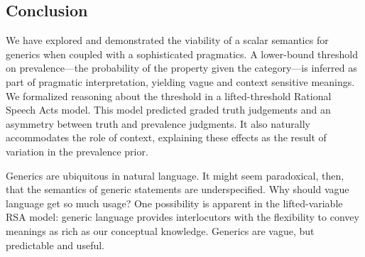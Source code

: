 \documentclass[10pt,letterpaper]{article}
\begin{document}
%
% 
\subsection{Conclusion} 


We have explored and demonstrated the viability of a scalar semantics for generics when coupled with a sophisticated pragmatics. 
A lower-bound threshold on prevalence---the probability of the property given the category---is inferred as part of pragmatic interpretation, yielding vague and context sensitive meanings. 
%
%
We formalized reasoning about the threshold in a lifted-threshold Rational Speech Acts model. This model predicted graded truth judgements and an asymmetry between truth and prevalence judgments. It also naturally accommodates the role of context, explaining these effects as the result of variation in the prevalence prior. 

Generics are ubiquitous in natural language. It might seem paradoxical, then, that the semantics of generic statements are underspecified. Why should vague language get so much usage? One possibility is apparent in the lifted-variable RSA model: generic language provides interlocutors with the flexibility to convey meanings as rich as our conceptual knowledge. %
Generics are vague, but predictable and useful.
\end{document}
